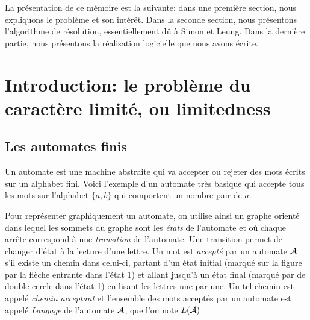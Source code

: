 \documentclass[12pt]{memoir}
\begin{document}
\medskip
La présentation de ce mémoire est la suivante: dans une première section, nous
expliquons le problème et son intérêt. Dans la seconde section, nous
présentons l'algorithme de résolution, essentiellement dû à Simon et
Leung. Dans la dernière partie, nous présentons la réalisation logicielle que
nous avons écrite.

\frontmatter
\begingroup
\setlength{\beforechapskip}{0pt} %
\tableofcontents*
\endgroup

\mainmatter


\chapter{Introduction: le problème du caractère limité, ou limitedness}

\section{Les automates finis}
Un automate est une machine abstraite qui va accepter ou rejeter des mots
écrits sur un alphabet fini. 
Voici l'exemple d'un automate très basique qui accepte tous les mots sur l'alphabet $\{a, b\}$ qui comportent un nombre pair de $a$.
\begin{center}
\end{center}

Pour représenter graphiquement un automate, on utilise ainsi un graphe orienté
dans lequel les sommets du graphe sont les \emph{états} de l'automate et où
chaque arrête correspond à une \emph{transition} de l'automate. Une transition permet de
changer d'état à la lecture d'une lettre. Un mot est \emph{accepté} par un
automate $\mathcal{A}$ s'il existe un chemin dans celui-ci, partant d'un état
initial (marqué sur la figure par la flèche entrante dans l'état 1) et allant
jusqu'à un état final (marqué par de double cercle dans l'état 1) en lisant
les lettres une par une. Un tel chemin est appelé \textit{chemin acceptant} et
l'ensemble des mots acceptés par un automate est appelé \textit{Langage} de
l'automate $\mathcal{A}$, que l'on note $L(\mathcal{A})$.
\end{document}
